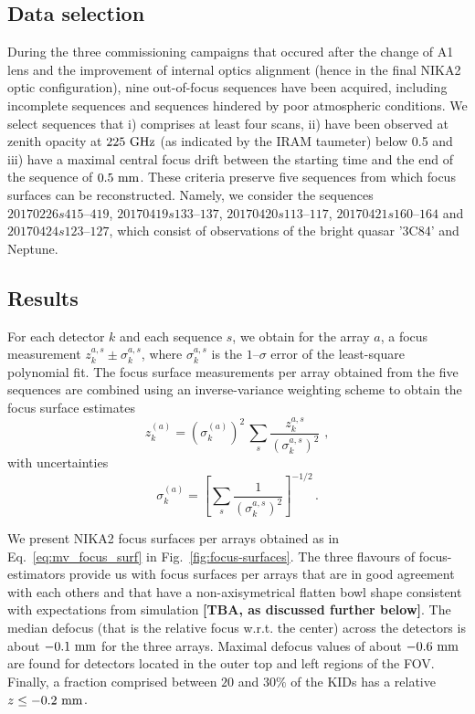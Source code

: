 \subsection{Data selection}

During the three commissioning campaigns that occured after the change of A1
lens and the improvement of internal optics alignment (hence in the
final NIKA2 optic configuration),
nine out-of-focus
\bms sequences have been acquired, including incomplete
sequences and sequences hindered by poor atmospheric conditions. We
select sequences that i) comprises at least four scans, ii) have been
observed at zenith opacity at $225~\rm{GHz}$ (as indicated by
the IRAM taumeter) below 0.5 and iii) have a maximal central focus
drift between the starting time and the end of the sequence of
$0.5~\rm{mm}$. These criteria preserve five sequences from which focus
surfaces can be reconstructed. Namely, we consider the sequences
$20170226s415\mbox{--}419$, $20170419s133\mbox{--}137$, $20170420s113\mbox{--}117$,
$20170421s160\mbox{--}164$ and $20170424s123\mbox{--}127$, which consist of observations
of the bright quasar '3C84' and Neptune.

\subsection{Results}
For each detector $k$ and each \bm sequence $s$, we obtain for
the array $a$, a focus measurement $z_k^{a, s} \pm \sigma_k^{a, s}$,
where $\sigma_k^{a, s}$ is the $1\mbox{--}\sigma$ error of the least-square
polynomial fit. The focus surface measurements per array obtained from the five
\bm sequences are combined using an inverse-variance weighting
scheme to obtain the focus surface estimates 
\begin{equation}
\label{eq:mv_focus_surf}
z_k^{(a)} = \left( \sigma_k^{(a)} \right)^2 \,  \sum_s \frac{z_k^{a,s}}{\left(\sigma_k^{a,s}\right)^2}\, \,  ,
\end{equation}
with uncertainties 
\begin{equation}
\label{eq:error_mv_focus_surf}
\sigma_k^{(a)} = \left[ \sum_s \frac{1}{\left(\sigma_k^{a,s}\right)^2}\right]^{-1/2}\, .
\end{equation}


We present NIKA2 focus surfaces per arrays obtained as in
Eq.~\ref{eq:mv_focus_surf} 
in Fig.~\ref{fig:focus-surfaces}.
The three flavours of focus-estimators provide us with focus surfaces
per arrays that are in good agreement with each others and that have a
non-axisymetrical flatten bowl shape consistent with expectations from
simulation {\bf [TBA, as discussed further below]}.
The median defocus (that is the relative focus w.r.t. the center)
across the detectors is about
$-0.1~\rm{mm}$ for the three arrays. Maximal defocus values of about
$-0.6~\rm{mm}$ are found for detectors located in the outer top and
left regions of the FOV. Finally, a fraction comprised between $20$
and $30\%$ of the KIDs has a relative $z\le -0.2~\rm{mm}$.  

